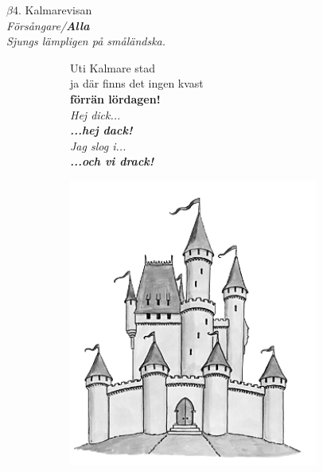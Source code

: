 \documentclass[a6paper,10pt]{article}
\begin{document}
\setlength{\oddsidemargin}{-0.47in}
\begin{center}
\Large $\beta4$. Kalmarevisan \\ 
\small \textit{Försångare/\textbf{Alla}\\Sjungs lämpligen på småländska.}
\end{center}
\begin{figure}[!h]
\begin{subfigure}{0.55\textwidth}
\small Uti Kalmare stad\\
ja där finns det ingen kvast\\
\textbf{förrän lördagen!}
\vspace{5pt}\\
\textit{Hej dick... \\
\textbf{...hej dack!}\vspace{5pt} \\
Jag slog i...\\
\textbf{...och vi drack!}}
\end{subfigure}
\begin{subfigure}{0.41\textwidth}
\includegraphics[width=0.9\textwidth]{kalmarslott3.png}
\end{subfigure}
\end{figure}
\vspace{-5pt}
\end{document}
